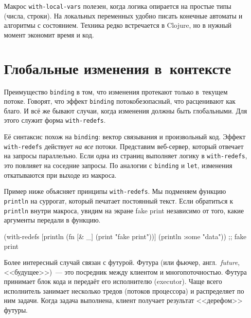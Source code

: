 \fi

Макрос \verb|with-local-vars| полезен, когда логика опирается на простые типы
(числа, строки). На локальных переменных удобно писать конечные автоматы и
алгоритмы с состоянием. Техника редко встречается в Clojure, но в нужный момент
экономит время и код.

\section{Глобальные изменения в~контексте}


\label{with-redefs}

Преимущество \verb|binding| в том, что изменения протекают только в~текущем
потоке. Говорят, что эффект \verb|binding| потокобезопасный, что расценивают
как благо. И всё же бывают случаи, когда изменения должны быть глобальными. Для
этого служит форма \verb|with-redefs|.

Её синтаксис похож на \verb|binding|: вектор связывания и произвольный
код. Эффект \verb|with-redefs| действует \emph{на все} потоки. Представим
веб-сервер, который отвечает на запросы параллельно. Если одна из страниц
выполняет логику в \verb|with-redefs|, это повлияет на соседние
запросы. По аналогии с \verb|binding| и \verb|let|, изменения откатываются при
выходе из макроса.

Пример ниже объясняет принципы \texttt{with\--re\-defs}. Мы подменяем функцию
\verb|println| на суррогат, который печатает постоянный текст. Если обратиться к
\verb|println| внутри макроса, увидим на экране fake print независимо от того,
какие аргументы передали в функцию.


\begin{english}
  \begin{clojure}
(with-redefs [println (fn [& _]
                        (print "fake print\n"))]
  (println {:some "data"}))
;; fake print
  \end{clojure}
\end{english}


Более интересный случай связан с футурой. Футура (или фьючер,
англ.~\emph{future}, <<будущее>>)~--- это посредник между клиентом и
многопоточностью. Футура принимает блок кода и передаёт его исполнителю
(executor). Чаще всего исполнитель занимает несколько тредов (потоков
процессора) и распределяет по ним задачи. Когда задача выполнена, клиент
получает результат <<дерефом>> футуры.

